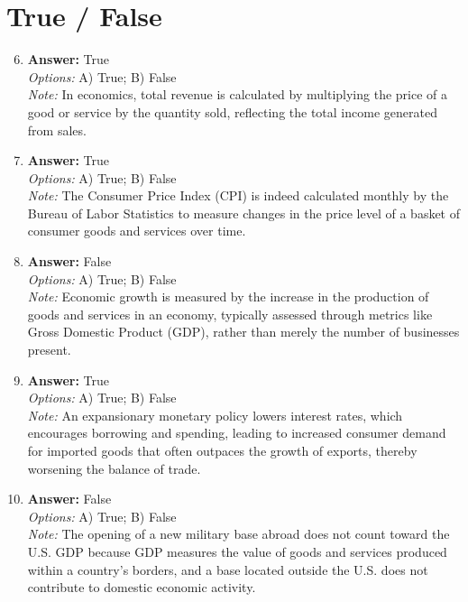 \documentclass[12pt]{article}
\begin{document}
\section*{True / False}
\begin{enumerate}[label=\arabic*.]
\setcounter{enumi}{5}
\item \textbf{Answer:} True
\\ \textit{Options:} A) True; B) False
\\ \textit{Note:} In economics, total revenue is calculated by multiplying the price of a good or service by the quantity sold, reflecting the total income generated from sales.
\item \textbf{Answer:} True
\\ \textit{Options:} A) True; B) False
\\ \textit{Note:} The Consumer Price Index (CPI) is indeed calculated monthly by the Bureau of Labor Statistics to measure changes in the price level of a basket of consumer goods and services over time.
\item \textbf{Answer:} False
\\ \textit{Options:} A) True; B) False
\\ \textit{Note:} Economic growth is measured by the increase in the production of goods and services in an economy, typically assessed through metrics like Gross Domestic Product (GDP), rather than merely the number of businesses present.
\item \textbf{Answer:} True
\\ \textit{Options:} A) True; B) False
\\ \textit{Note:} An expansionary monetary policy lowers interest rates, which encourages borrowing and spending, leading to increased consumer demand for imported goods that often outpaces the growth of exports, thereby worsening the balance of trade.
\item \textbf{Answer:} False
\\ \textit{Options:} A) True; B) False
\\ \textit{Note:} The opening of a new military base abroad does not count toward the U.S. GDP because GDP measures the value of goods and services produced within a country's borders, and a base located outside the U.S. does not contribute to domestic economic activity.
\end{enumerate}
\end{document}
